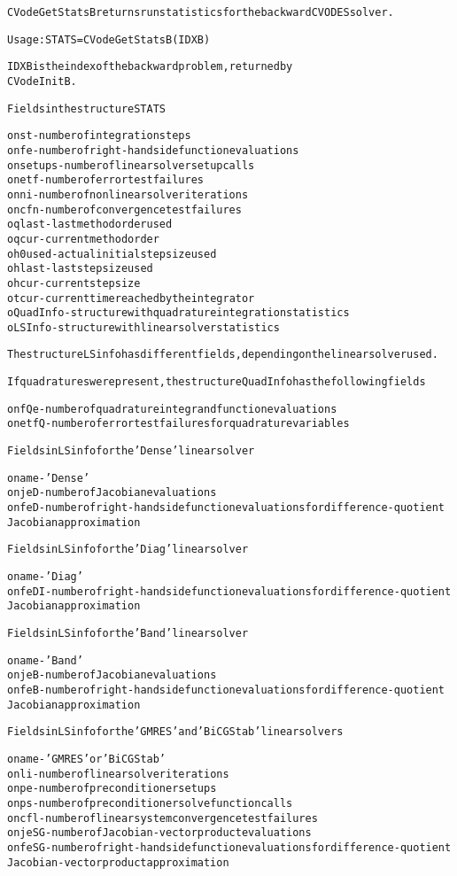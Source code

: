 \begin{alltt}
CVodeGetStatsB returns run statistics for the backward CVODES solver.

   Usage: STATS = CVodeGetStatsB( IDXB ) 

   IDXB     is the index of the backward problem, returned by
            CVodeInitB.

Fields in the structure STATS

o nst - number of integration steps
o nfe - number of right-hand side function evaluations
o nsetups - number of linear solver setup calls
o netf - number of error test failures
o nni - number of nonlinear solver iterations
o ncfn - number of convergence test failures
o qlast - last method order used
o qcur - current method order
o h0used - actual initial step size used
o hlast - last step size used
o hcur - current step size
o tcur - current time reached by the integrator
o QuadInfo - structure with quadrature integration statistics
o LSInfo - structure with linear solver statistics

The structure LSinfo has different fields, depending on the linear solver used.

If quadratures were present, the structure QuadInfo has the following fields

o nfQe - number of quadrature integrand function evaluations
o netfQ - number of error test failures for quadrature variables

  Fields in LSinfo for the 'Dense' linear solver

o name - 'Dense'
o njeD - number of Jacobian evaluations
o nfeD - number of right-hand side function evaluations for difference-quotient
         Jacobian approximation

  Fields in LSinfo for the 'Diag' linear solver

o name - 'Diag'
o nfeDI - number of right-hand side function evaluations for difference-quotient
          Jacobian approximation

  Fields in LSinfo for the 'Band' linear solver

o name - 'Band'
o njeB - number of Jacobian evaluations
o nfeB - number of right-hand side function evaluations for difference-quotient
         Jacobian approximation

  Fields in LSinfo for the 'GMRES' and 'BiCGStab' linear solvers

o name - 'GMRES' or 'BiCGStab'
o nli - number of linear solver iterations
o npe - number of preconditioner setups
o nps - number of preconditioner solve function calls
o ncfl - number of linear system convergence test failures
o njeSG - number of Jacobian-vector product evaluations
o nfeSG -  number of right-hand side function evaluations for difference-quotient
          Jacobian-vector product approximation
\end{alltt}






\vspace{0.1in}